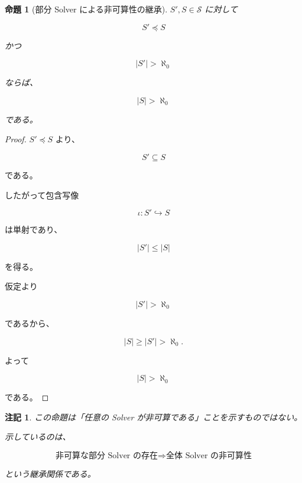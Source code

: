 \documentclass[a4paper,11pt]{article}
\newtheorem{proposition}[definition]{命題}
\newtheorem{remark}[definition]{注記}
\newcommand{\Solver}{\mathcal{S}}
\newcommand{\SubSolver}{\preceq}
\begin{document}
\begin{proposition}[部分 Solver による非可算性の継承]
$S',S\in\Solver$ に対して

\begin{equation}
    S'\SubSolver S
\end{equation}

かつ

\begin{equation}
    |S'|>\aleph_0
\end{equation}

ならば、

\begin{equation}
    |S|>\aleph_0
\end{equation}

である。
\end{proposition}

\begin{proof}
$S'\SubSolver S$ より、

\begin{equation}
    S'\subseteq S
\end{equation}

である。

したがって包含写像

\begin{equation}
    \iota:S'\hookrightarrow S
\end{equation}

は単射であり、

\begin{equation}
    |S'|\leq|S|
\end{equation}

を得る。

仮定より

\begin{equation}
    |S'|>\aleph_0
\end{equation}

であるから、

\begin{equation}
    |S|
    \geq
    |S'|
    >
    \aleph_0.
\end{equation}

よって

\begin{equation}
    |S|>\aleph_0
\end{equation}

である。
\end{proof}

\begin{remark}
この命題は「任意の Solver が非可算である」ことを示すものではない。

示しているのは、

\[
\text{非可算な部分 Solver の存在}
\Longrightarrow
\text{全体 Solver の非可算性}
\]

という継承関係である。
\end{remark}
\end{document}
